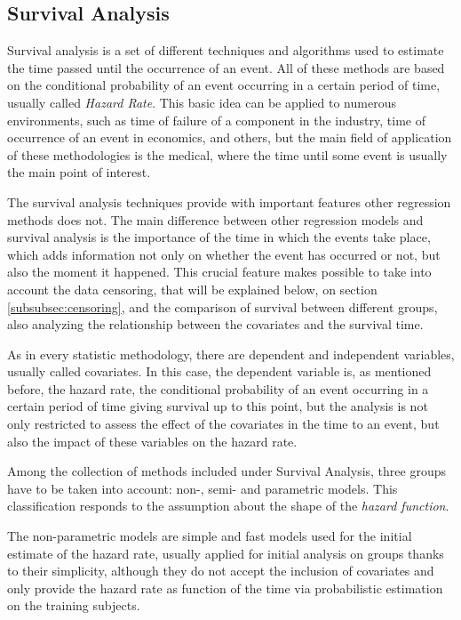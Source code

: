 \documentclass[11pt]{article} %
\begin{document}
  \subsection{Survival Analysis}

    Survival analysis is a set of different techniques and algorithms used to estimate the time passed until the occurrence of an event. All of these methods are based on the conditional probability of an event occurring in a certain period of time, usually called \emph{Hazard Rate}. This basic idea can be applied to numerous environments, such as time of failure of a component in the industry, time of occurrence of an event in economics, and others, but the main field of application of these methodologies is the medical, where the time until some event is usually the main point of interest.

    The survival analysis techniques provide with important features other regression methods does not. The main difference between other regression models and survival analysis is the importance of the time in which the events take place, which adds information not only on whether the event has occurred or not, but also the moment it happened. This crucial feature makes possible to take into account the data censoring, that will be explained below, on section \ref{subsubsec:censoring}, and the comparison of survival between different groups, also analyzing the relationship between the covariates and the survival time.

    As in every statistic methodology, there are dependent and independent variables, usually called covariates. In this case, the dependent variable is, as mentioned before, the hazard rate, the conditional probability of an event occurring in a certain period of time giving survival up to this point, but the analysis is not only restricted to assess the effect of the covariates in the time to an event, but also the impact of these variables on the hazard rate.

    Among the collection of methods included under Survival Analysis, three groups have to be taken into account: non-, semi- and parametric models. This classification responds to the assumption about the shape of the \emph{hazard function}.

    The non-parametric models are simple and fast models used for the initial estimate of the hazard rate, usually applied for initial analysis on groups thanks to their simplicity, although they do not accept the inclusion of covariates and only provide the hazard rate as function of the time via probabilistic estimation on the training subjects.
\end{document}

